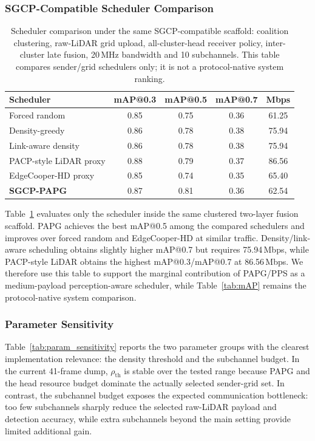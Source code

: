 \documentclass[conference]{IEEEtran}
\begin{document}
\subsubsection{SGCP-Compatible Scheduler Comparison}

\begin{table}[htbp]
\centering
\caption{Scheduler comparison under the same SGCP-compatible scaffold: coalition clustering, raw-LiDAR grid upload, all-cluster-head receiver policy, inter-cluster late fusion, 20\,MHz bandwidth and 10 subchannels. This table compares sender/grid schedulers only; it is not a protocol-native system ranking.}
\label{tab:scheduler_comparison}
\begin{tabular}{|l|ccc|c|}
\hline
Scheduler & mAP@0.3 & mAP@0.5 & mAP@0.7 & Mbps \\
\hline
Forced random & 0.85 & 0.75 & 0.36 & 61.25 \\
Density-greedy & 0.86 & 0.78 & 0.38 & 75.94 \\
Link-aware density & 0.86 & 0.78 & 0.38 & 75.94 \\
PACP-style LiDAR proxy & 0.88 & 0.79 & 0.37 & 86.56 \\
EdgeCooper-HD proxy & 0.85 & 0.74 & 0.35 & 65.40 \\
\textbf{SGCP-PAPG} & 0.87 & 0.81 & 0.36 & 62.54 \\
\hline
\end{tabular}
\end{table}

Table~\ref{tab:scheduler_comparison} evaluates only the scheduler inside the same clustered two-layer fusion scaffold. PAPG achieves the best mAP@0.5 among the compared schedulers and improves over forced random and EdgeCooper-HD at similar traffic. Density/link-aware scheduling obtains slightly higher mAP@0.7 but requires 75.94\,Mbps, while PACP-style LiDAR obtains the highest mAP@0.3/mAP@0.7 at 86.56\,Mbps. We therefore use this table to support the marginal contribution of PAPG/PPS as a medium-payload perception-aware scheduler, while Table~\ref{tab:mAP} remains the protocol-native system comparison.

\subsubsection{Parameter Sensitivity}

Table~\ref{tab:param_sensitivity} reports the two parameter groups with the clearest implementation relevance: the density threshold and the subchannel budget. In the current 41-frame dump, $\rho_{\mathrm{th}}$ is stable over the tested range because PAPG and the head resource budget dominate the actually selected sender-grid set. In contrast, the subchannel budget exposes the expected communication bottleneck: too few subchannels sharply reduce the selected raw-LiDAR payload and detection accuracy, while extra subchannels beyond the main setting provide limited additional gain.
\end{document}
